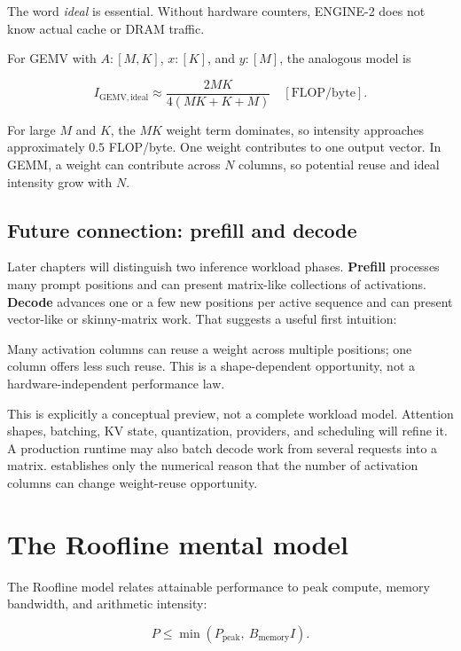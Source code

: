 The word \emph{ideal} is essential. Without hardware counters, ENGINE-2
does not know actual cache or DRAM traffic.

For GEMV with \(A:[M,K]\), \(x:[K]\), and \(y:[M]\), the analogous model
is

\begin{equation}
I_{\mathrm{GEMV,ideal}}
\approx\frac{2MK}{4(MK+K+M)}\quad[\mathrm{FLOP/byte}].
\end{equation}

For large \(M\) and \(K\), the \(MK\) weight term dominates, so
intensity approaches approximately \(0.5\) FLOP/byte. One weight
contributes to one output vector. In GEMM, a weight can contribute
across \(N\) columns, so potential reuse and ideal intensity grow with
\(N\).

\subsection{Future connection: prefill and
decode}\label{future-connection-prefill-and-decode}

Later chapters will distinguish two inference workload phases.
\textbf{Prefill} processes many prompt positions and can present
matrix-like collections of activations. \textbf{Decode} advances one or
a few new positions per active sequence and can present vector-like or
skinny-matrix work. That suggests a useful first intuition:

Many activation columns can reuse a weight across multiple positions; one column offers less such reuse. This is a shape-dependent opportunity, not a hardware-independent performance law.

This is explicitly a conceptual preview, not a complete workload model.
Attention shapes, batching, KV state, quantization, providers, and
scheduling will refine it. A production runtime may also batch decode
work from several requests into a matrix.  establishes only the
numerical reason that the number of activation columns can change
weight-reuse opportunity.

\section{The Roofline mental model}\label{the-roofline-mental-model}

The Roofline model relates attainable performance to peak compute,
memory bandwidth, and arithmetic intensity:

\begin{equation}
P\le\min\left(P_{\mathrm{peak}},\ B_{\mathrm{memory}}I\right).
\end{equation}

